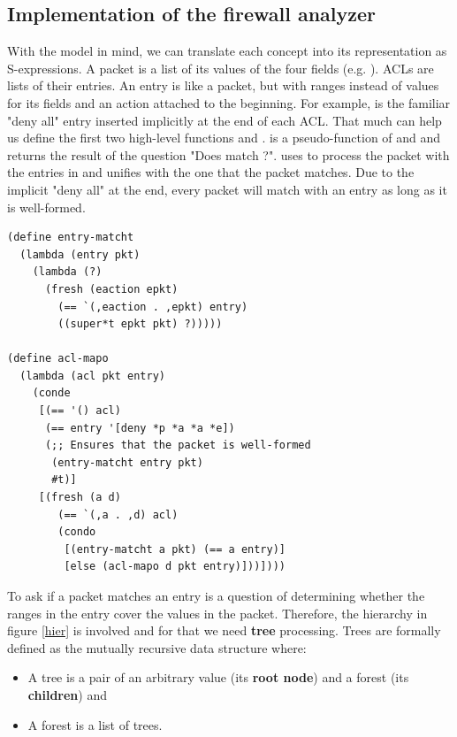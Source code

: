 \subsection{Implementation of the firewall analyzer}
With the model in mind, we can translate each concept into its representation as S-expressions. A packet is a list of its values of the four fields (e.g. ). ACLs are lists of their entries. An entry is like a packet, but with ranges instead of values for its fields and an action attached to the beginning. For example,  is the familiar "deny all" entry inserted implicitly at the end of each ACL. That much can help us define the first two high-level functions  and .  is a pseudo-function of  and  and returns the result of the question "Does  match ?".  uses  to process the packet  with the entries in  and unifies  with the one that the packet matches. Due to the implicit "deny all" at the end, every packet will match with an entry as long as it is well-formed.
\begin{lstlisting}
(define entry-matcht
  (lambda (entry pkt)
    (lambda (?)
      (fresh (eaction epkt)
        (== `(,eaction . ,epkt) entry)
        ((super*t epkt pkt) ?)))))

(define acl-mapo
  (lambda (acl pkt entry)
    (conde
     [(== '() acl)
      (== entry '[deny *p *a *a *e])
      (;; Ensures that the packet is well-formed
       (entry-matcht entry pkt)
       #t)]
     [(fresh (a d)
        (== `(,a . ,d) acl)
        (condo
         [(entry-matcht a pkt) (== a entry)]
         [else (acl-mapo d pkt entry)]))])))
\end{lstlisting}

To ask if a packet matches an entry is a question of determining whether the ranges in the entry cover the values in the packet. Therefore, the hierarchy in figure \ref{hier} is involved and for that we need \textbf{tree} processing. Trees are formally defined as the mutually recursive data structure where:
\begin{itemize}
    \item A tree is a pair of an arbitrary value (its \textbf{root node}) and a forest (its \textbf{children}) and
    \item A forest is a list of trees.
\end{itemize}

